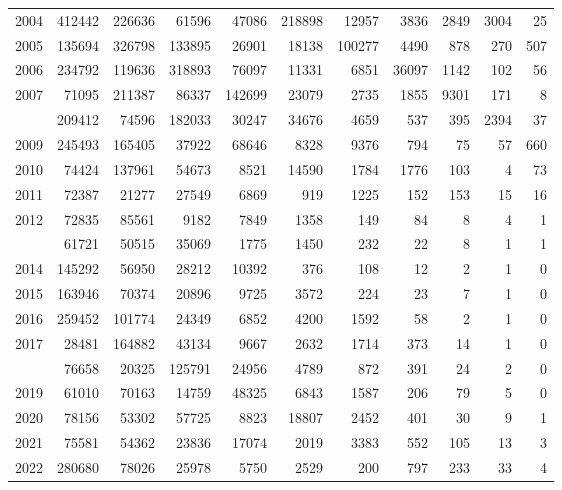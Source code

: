 \documentclass[
]{article}
\begin{document}
\begin{longtable}[t]{lrrrrrrrrrr}
2004 & 412442 & 226636 & 61596 & 47086 & 218898 & 12957 & 3836 & 2849 & 3004 & 25\\
2005 & 135694 & 326798 & 133895 & 26901 & 18138 & 100277 & 4490 & 878 & 270 & 507\\
2006 & 234792 & 119636 & 318893 & 76097 & 11331 & 6851 & 36097 & 1142 & 102 & 56\\
2007 & 71095 & 211387 & 86337 & 142699 & 23079 & 2735 & 1855 & 9301 & 171 & 8\\
\addlinespace
2008 & 209412 & 74596 & 182033 & 30247 & 34676 & 4659 & 537 & 395 & 2394 & 37\\
2009 & 245493 & 165405 & 37922 & 68646 & 8328 & 9376 & 794 & 75 & 57 & 660\\
2010 & 74424 & 137961 & 54673 & 8521 & 14590 & 1784 & 1776 & 103 & 4 & 73\\
2011 & 72387 & 21277 & 27549 & 6869 & 919 & 1225 & 152 & 153 & 15 & 16\\
2012 & 72835 & 85561 & 9182 & 7849 & 1358 & 149 & 84 & 8 & 4 & 1\\
\addlinespace
2013 & 61721 & 50515 & 35069 & 1775 & 1450 & 232 & 22 & 8 & 1 & 1\\
2014 & 145292 & 56950 & 28212 & 10392 & 376 & 108 & 12 & 2 & 1 & 0\\
2015 & 163946 & 70374 & 20896 & 9725 & 3572 & 224 & 23 & 7 & 1 & 0\\
2016 & 259452 & 101774 & 24349 & 6852 & 4200 & 1592 & 58 & 2 & 1 & 0\\
2017 & 28481 & 164882 & 43134 & 9667 & 2632 & 1714 & 373 & 14 & 1 & 0\\
\addlinespace
2018 & 76658 & 20325 & 125791 & 24956 & 4789 & 872 & 391 & 24 & 2 & 0\\
2019 & 61010 & 70163 & 14759 & 48325 & 6843 & 1587 & 206 & 79 & 5 & 0\\
2020 & 78156 & 53302 & 57725 & 8823 & 18807 & 2452 & 401 & 30 & 9 & 1\\
2021 & 75581 & 54362 & 23836 & 17074 & 2019 & 3383 & 552 & 105 & 13 & 3\\
2022 & 280680 & 78026 & 25978 & 5750 & 2529 & 200 & 797 & 233 & 33 & 4\\*
\end{longtable}
\end{document}
